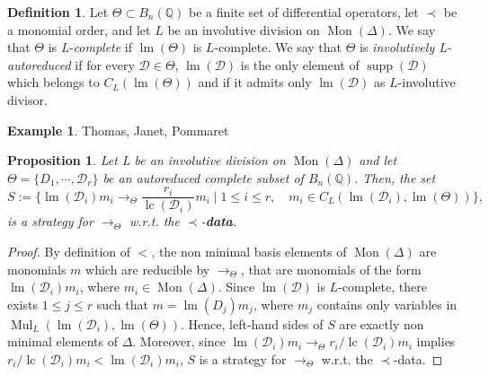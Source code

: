 \documentclass[10pt]{easychair}
\newtheorem{proposition}[theorem]{Proposition}
\theoremstyle{definition}
\newtheorem{definition}[theorem]{Definition}
\newtheorem{example}[theorem]{Example}
\newcommand\data{{\color{red}\bf data}}
\DeclareMathOperator{\supp}{supp}
\newcommand\D{\mathcal{D}}
\DeclareMathOperator{\lm}{lm}
\DeclareMathOperator{\lc}{lc}
\newcommand\Q{\mathbb{Q}}
\newcommand\Weyl[1]{B_{#1}(\Q)}
\DeclareMathOperator{\Mon}{Mon}
\DeclareMathOperator{\Mul}{Mul}
\newcommand\rewTheta{\to_{\Theta}}
\begin{document}
\begin{definition}
  Let $\Theta\subset\Weyl{n}$ be a finite set of differential operators,
  let $\prec$ be a monomial order, and let $L$ be an involutive division
  on $\Mon(\Delta)$. We say that $\Theta$ is {\em L-complete} if
  $\lm(\Theta)$ is $L$-complete. We say that $\Theta$ is
  {\em involutively L-autoreduced} if for every $\D\in\Theta$, $\lm(\D)$
  is the only element of $\supp(\D)$ which belongs to $C_L(\lm(\Theta))$
  and if it admits only $\lm(\D)$ as $L$-involutive divisor.
\end{definition}

\begin{example}
  Thomas, Janet, Pommaret
\end{example}

\begin{proposition}
  Let L be an involutive division on $\Mon(\Delta)$ and let
  $\Theta=\{D_1,\cdots,\D_r\}$ be an autoreduced complete subset of
  $\Weyl{n}$. Then, the set 
  \[S:=\{\lm(\D_i)m_i\rewTheta\frac{r_i}{\lc(\D_i)}m_i\mid1\leq i\leq r,
  \quad m_i\in C_L(\lm(\D_i),\lm(\Theta))\},\]
  is a strategy for $\rewTheta$ w.r.t. the $\prec$-\data.
\end{proposition}

\begin{proof}
  By definition of $<$, the non minimal basis elements of $\Mon(\Delta)$
  are monomials $m$ which are reducible by $\rewTheta$, that are
  monomials of the form $\lm(\D_i)m_i$, where $m_i\in\Mon(\Delta)$. Since
  $\lm(\D)$ is $L$-complete, there exists $1\leq j\leq r$ such that
  $m=\lm(D_j)m_j$, where $m_j$ contains only variables in
  $\Mul_L(\lm(\D_i),\lm(\Theta))$. Hence, left-hand sides of $S$ are
  exactly non minimal elements of $\Delta$. Moreover, since
  $\lm(\D_i)m_i\rewTheta r_i/\lc(\D_i)m_i$ implies
  $r_i/\lc(\D_i)m_i<\lm(\D_i)m_i$, $S$ is a strategy for $\rewTheta$
  w.r.t. the $\prec$-data.
\end{proof}
\end{document}
